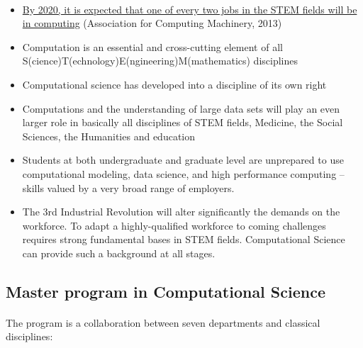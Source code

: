 \documentclass[%
oneside,                 %
final,                   %
10pt]{article}
\begin{document}
\paragraph{}
\begin{itemize}
\item \href{{http://pathways.acm.org/executive-summary.html}}{By 2020, it is expected that one of every two jobs in the STEM fields will be in computing} (Association for Computing Machinery, 2013)

\item Computation is an essential and cross-cutting element of all S(cience)T(echnology)E(ngineering)M(mathematics) disciplines

\item Computational science has developed into a discipline of its own right

\item Computations and the understanding of large data sets will play an even larger role in basically all disciplines of STEM fields, Medicine, the Social Sciences, the Humanities and  education

\item Students at both undergraduate and graduate level are unprepared to use computational modeling, data science, and high performance computing – skills valued by a very broad range of employers.

\item The 3rd Industrial Revolution will alter significantly the demands on the workforce. To adapt a highly-qualified workforce to coming challenges  requires strong fundamental bases in STEM fields. Computational Science can provide such a background at all stages.
\end{itemize}

\noindent




\subsection{Master program in Computational Science}

\paragraph{}

The program is a collaboration between seven departments and classical disciplines:
\end{document}
